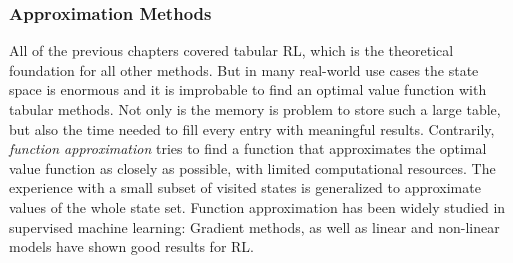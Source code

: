 \documentclass[a4paper, twoside, 12pt]{article}
\begin{document}
\subsubsection{Approximation Methods}
\label{sec:org70a9609}
All of the previous chapters covered tabular RL, which is the theoretical
foundation for all other methods. But in many real-world use cases the state
space is enormous and it is improbable to find an optimal value function with
tabular methods. Not only is the memory is problem to store such a large table,
but also the time needed to fill every entry with meaningful results.
Contrarily, \emph{function approximation} tries to find a function that approximates
the optimal value function as closely as possible, with limited computational
resources. The experience with a small subset of visited states is generalized
to approximate values of the whole state set. Function approximation has been
widely studied in supervised machine learning: Gradient methods, as well as
linear and non-linear models have shown good results for RL.
\end{document}
